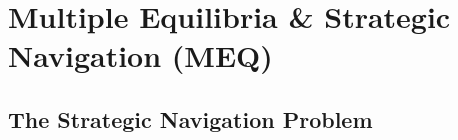 %
%

\chapter{Multiple Equilibria \& Strategic Navigation (MEQ)}
\label{app:meq}

\begin{abstract}
The MEP optimization problem (Appendix V) is non-convex when complementarities
are positive ($\bar{\gamma} > 0$), implying the potential existence of multiple
local and global optima. This appendix formalizes the \textbf{Multiple Equilibria
Theorem (MEQ)}, which characterizes when multiple equilibria exist, how to identify
the current equilibrium state, how to map the complete equilibrium landscape, and
how to construct meta-strategic decision sets for practitioners. The framework
answers the fundamental question: \textit{Given where we are, where can we go,
how do we get there, and is it worth it?}
\end{abstract}

\section{The Strategic Navigation Problem}
\label{sec:meq-problem}

